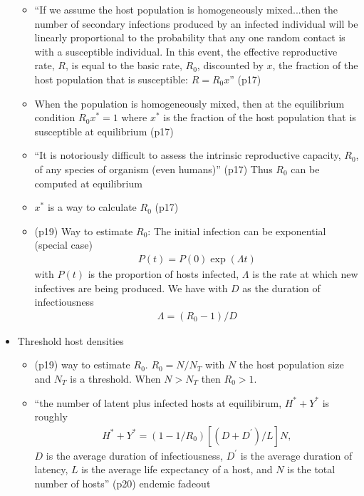 \documentclass{article}
\newcommand\rz{$R_0$}
\begin{document}
\begin{itemize}
\begin{itemize}
  \item ``If we assume the host population is homogeneously mixed...then the number of secondary infections produced by an infected individual will be linearly proportional to the probability that any one random contact is with a susceptible individual.  In this event, the effective reproductive rate, $R$, is equal to the basic rate, $R_0$, discounted by $x$, the fraction of the host population that is susceptible: $R=R_0x$'' (p17)
  \item When the population is homogeneously mixed, then at the equilibrium condition $R_0x^* = 1$ where $x^*$ is the fraction of the host population that is susceptible at equilibrium (p17)
  \item ``It is notoriously difficult to assess the intrinsic reproductive capacity, $R_0$, of any species of organism (even humans)'' (p17)  Thus $R_0$ can be computed at equilibrium
  \item  $x^*$ is a way to calculate $R_0$ (p17)
  \item  (p19) Way to estimate $R_0$:  The initial infection can be exponential (special case)
    \begin{align*}
      P(t) = P(0) \exp ( \Lambda t)
    \end{align*}
with $P(t)$ is the proportion of hosts infected, $\Lambda$ is the rate at which new infectives are being produced.  We have with $D$ as the duration of infectiousness
\begin{align*}
  \Lambda = (R_0 - 1)/D
\end{align*}
  \end{itemize}
\item Threshold host densities
  \begin{itemize}
  \item (p19) way to estimate \rz.  \rz $= N/N_T$ with $N$ the host population size and $N_T$ is a threshold.  When $N > N_T $ then $R_0  > 1$.
  \item ``the number of latent plus infected hosts at equilibirum, $H^* + Y^*$ is roughly
\begin{align*}
H^* + Y^* = (1 - 1/R_0)[ (D + D^\prime)/L] N,
\end{align*}
$D$ is the average duration of infectiousness, $D^\prime$ is the average duration of latency, $L$ is the average life expectancy of a host, and $N$ is the total number of hosts'' (p20) endemic fadeout
  \end{itemize}
\end{itemize}
\end{document}
